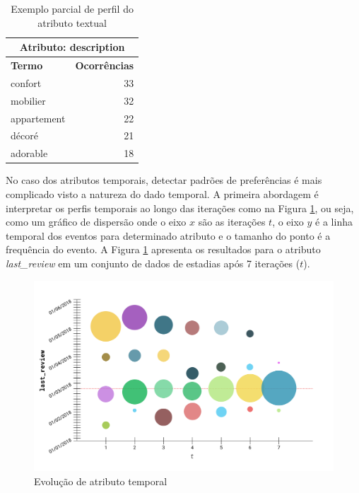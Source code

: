 \begin{table}[!h]
	\centering
	\begin{tabular}{|l|r|}
	\hline
	\multicolumn{2}{|c|}{\textbf{Atributo: description}} \\ \hline
	\textbf{Termo}     & \textbf{Ocorrências}     \\ \hline
	confort             & 33                       \\ \hline
	mobilier            & 32                       \\ \hline
	appartement             & 22                       \\ \hline
	décoré               & 21                       \\ \hline
	adorable               & 18                       \\ \hline
	\end{tabular}
	\caption{Exemplo parcial de perfil do atributo textual}
	\label{table:perfil-textual-2}
\end{table}

No caso dos atributos temporais, detectar padrões de preferências é mais complicado visto a natureza do dado temporal. A primeira abordagem é interpretar os perfis temporais ao longo das iterações como na Figura \ref{fig:analise-atributo-temporal}, ou seja, como um gráfico de dispersão onde o eixo $x$ são as iterações $t$, o eixo $y$ é a linha temporal dos eventos para determinado atributo e o tamanho do ponto é a frequência do evento. A Figura \ref{fig:analise-atributo-temporal} apresenta os resultados para o atributo {\em last\_review} em um conjunto de dados de estadias após 7 iterações ($t$).

\begin{figure}[!h]
	\centering
	\includegraphics[width=\textwidth]{imagens/analise-atributo-temporal}
	\caption{Evolução de atributo temporal}
	\label{fig:analise-atributo-temporal}
\end{figure}

